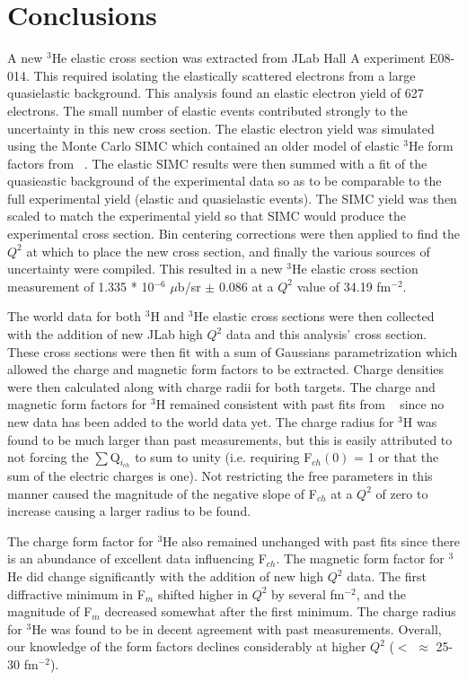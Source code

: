 \chapter{Conclusions} %
\label{ch:conclusions} %

A new $^3$He elastic cross section was extracted from JLab Hall A experiment E08-014. This required isolating the elastically scattered electrons from a large quasielastic background. This analysis found an elastic electron yield of 627 electrons. The small number of elastic events contributed strongly to the uncertainty in this new cross section. The elastic electron yield was simulated using the Monte Carlo SIMC which contained an older model of elastic $^3$He form factors from ~\cite{Article:Amroun}. The elastic SIMC results were then summed with a fit of the quasieastic background of the experimental data so as to be comparable to the full experimental yield (elastic and quasielastic events). The SIMC yield was then scaled to match the experimental yield so that SIMC would produce the experimental cross section. Bin centering corrections were then applied to find the $Q^2$ at which to place the new cross section, and finally the various sources of uncertainty were compiled. This resulted in a new $^3$He elastic cross section measurement of 1.335 * 10$^{-6}$ $\mu$b/sr $\pm$ 0.086 at a $Q^2$ value of 34.19 fm$^{-2}$. 

The world data for both $^3$H and $^3$He elastic cross sections were then collected with the addition of new JLab high $Q^2$ data and this analysis' cross section. These cross sections were then fit with a sum of Gaussians parametrization which allowed the charge and magnetic form factors to be extracted. Charge densities were then calculated along with charge radii for both targets. The charge and magnetic form factors for $^3$H remained consistent with past fits from ~\cite{Article:Amroun} since no new data has been added to the world data yet. The charge radius for $^3$H was found to be much larger than past measurements, but this is easily attributed to not forcing the $\sum$Q$_{i_{ch}}$ to sum to unity (i.e. requiring F$_{ch}(0)$ = 1 or that the sum of the electric charges is one). Not restricting the free parameters in this manner caused the magnitude of the negative slope of F$_{ch}$ at a $Q^2$ of zero to increase causing a larger radius to be found.

The charge form factor for $^3$He also remained unchanged with past fits since there is an abundance of excellent data influencing F$_{ch}$. The magnetic form factor for $^3$He did change significantly with the addition of new high $Q^2$ data. The first diffractive minimum in F$_m$ shifted higher in $Q^2$ by several fm$^{-2}$, and the magnitude of F$_m$ decreased somewhat after the first minimum. The charge radius for $^3$He was found to be in decent agreement with past measurements. Overall, our knowledge of the form factors declines considerably at higher $Q^2$ ($<$ $\approx$ 25-30 fm$^{-2}$). 

